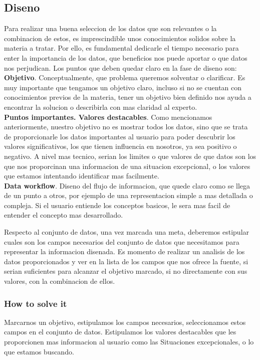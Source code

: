 \subsection{Diseno}
Para realizar una buena seleccion de los datos que son relevantes o la combinacion de estos, es imprescindible unos 
conocimientos solidos sobre la materia a tratar. Por ello, es fundamental dedicarle el tiempo necesario para enter la
importancia de los datos, que beneficios nos puede aportar o que datos nos perjudican.
Los puntos que deben quedar claro en la fase de diseno son:\\

 \textbf{Objetivo}. Conceptualmente, que problema queremos solventar o clarificar. Es muy importante que tengamos un objetivo claro,
    incluso si no se cuentan con conocimientos previos de la materia, tener un objetivo bien definido nos ayuda a encontrar la solucion o 
    describirla con mas claridad al experto.\\

 \textbf{Puntos importantes. Valores destacables}. Como mencionamos anteriormente, nuestro objetivo no es mostrar todos los datos, sino
    que se trata de proporcionarle los datos importantes al usuario para poder descubrir los valores significativos, los que tienen influencia en
    nosotros, ya sea positivo o negativo. A nivel mas tecnico, serian los limites o que valores de que datos son los que nos proporcinan una informacion
    de una situacion excepcional, o los valores que estamos intentando identificar mas facilmente.\\

 \textbf{Data workflow}. Diseno del flujo de informacion, que quede claro como se llega de un punto a otros, por ejemplo de una representacion
    simple a mas detallada o compleja. Si el usuario entiende los conceptos basicos, le sera mas facil de entender el concepto mas desarrollado.


Respecto al conjunto de datos, una vez marcada una meta, deberemos estipular cuales son los campos necesarios del conjunto de datos que necesitamos para representar la informacion
disenada. Es momento de realizar un analisis de los datos proporcionados y ver en la lista de los campos que nos ofrece la fuente, si serian
suficientes para alcanzar el objetivo marcado, si no directamente con sus valores, con la combinacion de ellos.

\subsubsection{How to solve it} 
Marcarnos un objetivo, estipulamos los campos necesarios, seleccionamos estos campos en el conjunto de datos. 
Estipulamos los valores destacables que les proporcionen mas informacion al usuario como las Situaciones excepcionales, o lo que estamos buscando.

